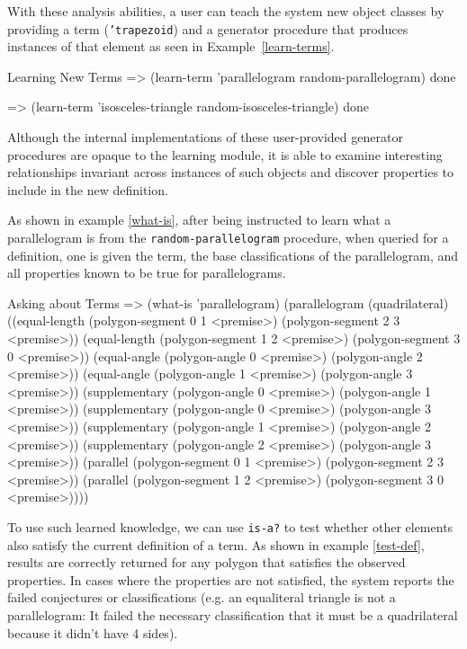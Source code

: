 With these analysis abilities, a user can teach the system new object
classes by providing a term (\texttt{'trapezoid}) and a generator
procedure that produces instances of that element as seen in
Example~\ref{learn-terms}.

\begin{repl-example}
[label=learn-terms]
{Learning New Terms}
=> (learn-term 'parallelogram random-parallelogram)
done

=> (learn-term 'isosceles-triangle random-isosceles-triangle)
done
\end{repl-example}

Although the internal implementations of these user-provided generator
procedures are opaque to the learning module, it is able to examine
interesting relationships invariant across instances of such objects
and discover properties to include in the new definition.

As shown in example \ref{what-is}, after being instructed to learn
what a parallelogram is from the \texttt{random-parallelogram}
procedure, when queried for a definition, one is given the term, the
base classifications of the parallelogram, and all properties known to
be true for parallelograms.

\begin{repl-example}
[label=what-is]
{Asking about Terms}
=> (what-is 'parallelogram)
(parallelogram
 (quadrilateral)
 ((equal-length (polygon-segment 0 1 <premise>)
                (polygon-segment 2 3 <premise>))
  (equal-length (polygon-segment 1 2 <premise>)
                (polygon-segment 3 0 <premise>))
  (equal-angle (polygon-angle 0 <premise>)
               (polygon-angle 2 <premise>))
  (equal-angle (polygon-angle 1 <premise>)
               (polygon-angle 3 <premise>))
  (supplementary (polygon-angle 0 <premise>)
                 (polygon-angle 1 <premise>))
  (supplementary (polygon-angle 0 <premise>)
                 (polygon-angle 3 <premise>))
  (supplementary (polygon-angle 1 <premise>)
                 (polygon-angle 2 <premise>))
  (supplementary (polygon-angle 2 <premise>)
                 (polygon-angle 3 <premise>))
  (parallel (polygon-segment 0 1 <premise>)
            (polygon-segment 2 3 <premise>))
  (parallel (polygon-segment 1 2 <premise>)
            (polygon-segment 3 0 <premise>))))
\end{repl-example}


To use such learned knowledge, we can use \texttt{is-a?} to test
whether other elements also satisfy the current definition of a
term. As shown in example \ref{test-def}, results are correctly
returned for any polygon that satisfies the observed properties. In
cases where the properties are not satisfied, the system reports the
failed conjectures or classifications (e.g. an equaliteral triangle is
not a parallelogram: It failed the necessary classification that it
must be a quadrilateral because it didn't have 4 sides).

